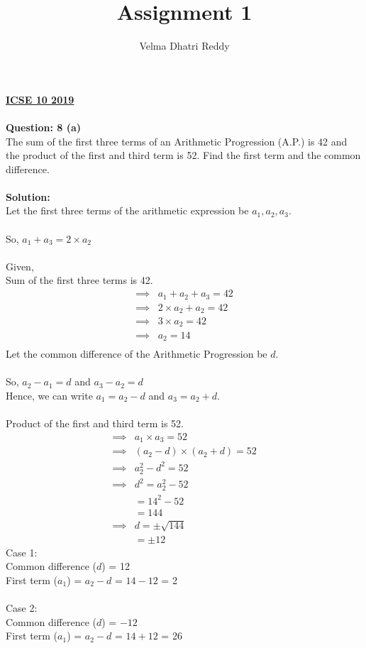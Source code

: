 \documentclass[12pt, a4paper] {article}
\title{Assignment 1}
\author{Velma Dhatri Reddy }
\begin{document}
\maketitle
\begin{multicols}{2}
\textbf{\underline{ICSE 10 2019}}\\\\
\textbf{Question: 8 (a)}\\
The sum of the first three terms of an Arithmetic Progression (A.P.) is 42 and the product of the first and third term is 52. Find the first term and the common difference.\\\\
\textbf{Solution: }\\
Let the first three terms of the arithmetic expression be $a_1, a_2, a_3$.\\\\
So, $a_1 + a_3 = 2\times a_2$\\\\
Given,\\
Sum of the first three terms is 42.
\begin{align*}
    \implies
    &a_1 + a_2 + a_3 = 42\\
    \implies
    &2 \times a_2 + a_2 = 42\\
    \implies
    & 3\times a_2 = 42\\
    \implies
    &a_2 = 14\\
\end{align*}
Let the common difference of the Arithmetic Progression be $d$.\\\\
So, $a_2 - a_1 = d$ and $a_3 - a_2 = d$\\
Hence, we can write $ a_1 = a_2 - d$ and $ a_3 = a_2 + d$.\\\\
Product of the first and third term is 52.
\begin{align*}
    \implies
    &a_1 \times a_3 = 52\\
    \implies 
    &(a_2 - d) \times (a_2 + d) = 52\\
    \implies
    &a_2^2 - d^2 = 52\\
    \implies
    &d^2 = a_2^2 - 52\\
    &= 14^2 - 52\\
    &= 144\\
    \implies
    &d = \pm \sqrt{144}\\
    &= \pm 12
\end{align*}
Case 1:\\
Common difference ($d$) = 12\\
First term ($a_1$) = $a_2 - d$ = $14 - 12$ = 2\\\\
Case 2:\\
Common difference ($d$) = $-12$\\
First term ($a_1$) = $a_2 - d$ = $14 + 12$ = 26\\
\end{multicols}
\end{document}
